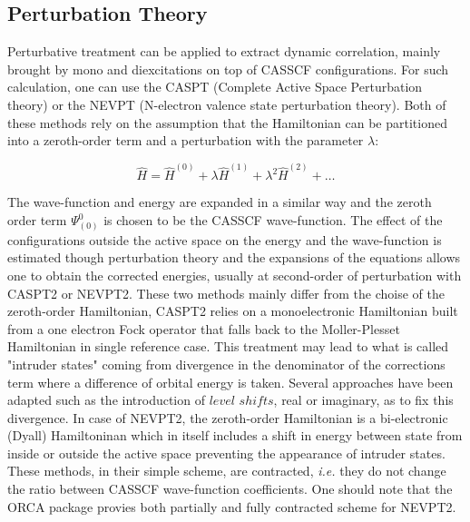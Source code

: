 \documentclass[12pt,a4paper]{report}
\numberwithin{equation}{section}
\begin{document}
\subsection{Perturbation Theory}

Perturbative treatment can be applied to extract dynamic correlation, mainly brought by mono and diexcitations on top of CASSCF configurations. 
For such calculation, one can use the CASPT (Complete Active Space Perturbation theory) or the NEVPT (N-electron valence state perturbation theory). Both of these methods rely on the assumption that the Hamiltonian can be partitioned into a zeroth-order term and a perturbation with the parameter $\lambda$:

\begin{equation}
    \hat{H}=\hat{H}^{(0)}+\lambda\hat{H}^{(1)}+\lambda^2 \hat{H}^{(2)}+\ldots
\end{equation}


The wave-function and energy are expanded in a similar way and the zeroth order term $\Psi_{(0)}^{0}$ is chosen to be the CASSCF wave-function. 
The effect of the configurations outside the active space on the energy and the wave-function is estimated though perturbation theory and the expansions of the equations allows one to obtain the corrected energies,
usually at second-order of perturbation with CASPT2\cite{noauthor_second-order_nodate} or NEVPT2\cite{angeli_introduction_2001,angeli_n-electron_2002}. These two methods mainly differ from the choise of the zeroth-order Hamiltonian, CASPT2 relies on a monoelectronic Hamiltonian built from a one electron Fock operator that falls back to the Moller-Plesset Hamiltonian in single reference case. 
This treatment may lead to what is called "intruder states" coming from divergence in the denominator of the corrections term where a difference of orbital energy is taken. Several approaches have been adapted such as the introduction of  $level$ $shifts$, real or imaginary, as to fix this divergence.
In case of NEVPT2, the zeroth-order Hamiltonian is a bi-electronic (Dyall) Hamiltoninan which in itself includes a shift in energy between state from inside or outside the active space preventing the appearance of intruder states.
These methods, in their simple scheme, are contracted, \textit{i.e.} they do not change the ratio between CASSCF wave-function coefficients.
One should note that the ORCA package provies both partially and fully contracted scheme for NEVPT2.
\end{document}
